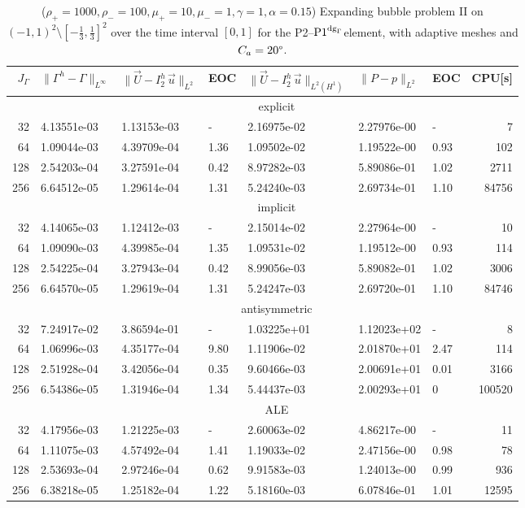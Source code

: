 \documentclass[a4paper,12pt,onecolumn]{article}
\newcommand{\errorXx}{\|\Gamma^h - \Gamma\|_{L^\infty}}
\newcommand{\LerrorUu}[1]{\|\vec U - I^h_{#1}\,\vec u\|_{L^2}}
\newcommand{\HerrorUu}[1]{\|\vec U - I^h_{#1}\,\vec u\|_{L^2(H^1)}}
\newcommand{\LerrorPp}{\|P - p\|_{L^2}}
\newcommand{\pdg}{${\rm P1}^{{\rm dg}_\Gamma}$} %
\begin{document}
\begin{table}
\center
\hspace*{-3.25cm}
\begin{tabular}{rllllllr}
\hline
$J_\Gamma$ & $\errorXx$ & $\LerrorUu2$ & EOC & $\HerrorUu2$ & $\LerrorPp$ & EOC
& CPU[s] \\
\hline
& \multicolumn{7}{c}{explicit} \\
\hline
 32 & 4.13551e-03 & 1.13153e-03 &    - & 2.16975e-02 & 2.27976e-00 &    - &
7 \\
 64 & 1.09044e-03 & 4.39709e-04 & 1.36 & 1.09502e-02 & 1.19522e-00 & 0.93 &
102 \\
128 & 2.54203e-04 & 3.27591e-04 & 0.42 & 8.97282e-03 & 5.89086e-01 & 1.02 &
2711 \\
256 & 6.64512e-05 & 1.29614e-04 & 1.31 & 5.24240e-03 & 2.69734e-01 & 1.10 &
84756 \\
\hline
& \multicolumn{7}{c}{implicit} \\
\hline
 32 & 4.14065e-03 & 1.12412e-03 &    - & 2.15014e-02 & 2.27964e-00 &    - &
10 \\
 64 & 1.09090e-03 & 4.39985e-04 & 1.35 & 1.09531e-02 & 1.19512e-00 & 0.93 &
114 \\
128 & 2.54225e-04 & 3.27943e-04 & 0.42 & 8.99056e-03 & 5.89082e-01 & 1.02 &
3006 \\
256 & 6.64570e-05 & 1.29619e-04 & 1.31 & 5.24247e-03 & 2.69720e-01 & 1.10 &
84746 \\
\hline
& \multicolumn{7}{c}{antisymmetric} \\
\hline
 32 & 7.24917e-02 & 3.86594e-01 &    - & 1.03225e+01 & 1.12023e+02 &    - &
 8 \\
 64 & 1.06996e-03 & 4.35177e-04 & 9.80 & 1.11906e-02 & 2.01870e+01 & 2.47 &
114 \\
128 & 2.51928e-04 & 3.42056e-04 & 0.35 & 9.60466e-03 & 2.00691e+01 & 0.01 &
3166 \\
256 & 6.54386e-05 & 1.31946e-04 & 1.34 & 5.44437e-03 & 2.00293e+01 &    0 &
100520 \\
\hline
& \multicolumn{7}{c}{ALE} \\
\hline
 32 & 4.17956e-03 & 1.21225e-03 &    - & 2.60063e-02 & 4.86217e-00 &    - &
11 \\
 64 & 1.11075e-03 & 4.57492e-04 & 1.41 & 1.19033e-02 & 2.47156e-00 & 0.98 &
78 \\
128 & 2.53693e-04 & 2.97246e-04 & 0.62 & 9.91583e-03 & 1.24013e-00 & 0.99 &
936 \\
256 & 6.38218e-05 & 1.25182e-04 & 1.22 & 5.18160e-03 & 6.07846e-01 & 1.01 &
12595 \\
\hline
\end{tabular}
\hspace*{-3.25cm}
\caption[Navier--Stokes expanding bubble II errors P2--\pdg]
{($\rho_+ = 1000,\rho_- = 100,\mu_+ = 10,\mu_- =1,\gamma = 1,\alpha=0.15$)
Expanding bubble problem II on $(-1,1)^2\setminus[-\frac{1}{3},\frac{1}{3}]^2$
over the time interval $[0,1]$ for the P2--\pdg element, with adaptive
meshes and $C_a=20\degree$.}
\label{tab:nsexpandingbubbleIIp2p1dg}
\end{table}
\end{document}
